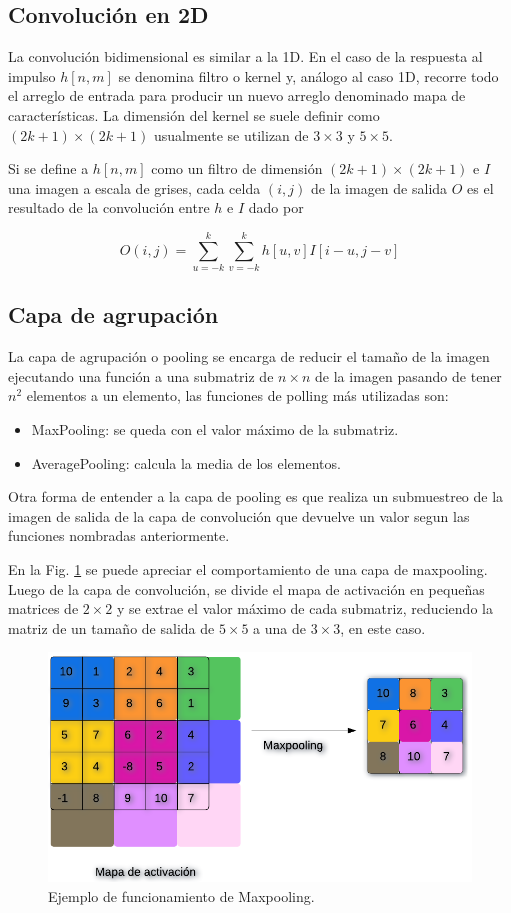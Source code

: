 \subsection{Convolución en 2D}

La convolución bidimensional es similar a la 1D. En el caso de la respuesta al impulso $h[n,m]$ se denomina filtro o kernel y, análogo al caso 1D, recorre todo el arreglo de entrada para producir un nuevo arreglo denominado mapa de características.
La dimensión del kernel se suele definir como $(2k + 1) \times (2k + 1)$ usualmente se utilizan de $3\times3$ y $5\times5$.


Si se define a $h[n,m]$ como un filtro de dimensión $(2k + 1) \times (2k + 1)$ e $I$ una imagen a escala de grises, cada celda $(i,j)$ de la imagen de salida $O$ es el
resultado de la convolución entre $h$ e $I$ dado por

\begin{equation}
    O(i,j)= \sum_{u=-k}^{k} \sum_{v=-k}^{k} h[u,v]I[i-u,j-v]
\end{equation}


\subsection{Capa de agrupación}

La capa de agrupación o pooling se encarga de reducir el tamaño de la imagen ejecutando una función a una submatriz de $n \times n$ de la imagen pasando de tener $n^2$ elementos a un elemento, las funciones de polling más utilizadas son:

\begin{itemize}
    \item MaxPooling: se queda con el valor máximo de la submatriz.
    \item AveragePooling: calcula la media de los elementos.
\end{itemize}

Otra forma de entender a la capa de pooling es que realiza un submuestreo de la imagen de salida de la capa de convolución que devuelve un valor segun las funciones nombradas anteriormente.

En la Fig. \ref{fig:ejemplo-mp} se puede apreciar el comportamiento de una capa de maxpooling. Luego de la capa de convolución, se divide el mapa de activación
en pequeñas matrices de $2 \times 2$ y se extrae el valor máximo de cada submatriz, reduciendo la matriz de un tamaño de salida de $5 \times 5$ a una de $3 \times 3$, en este caso.
\begin{figure}[bth]
    \centering
    \includegraphics[width=.6\textwidth]{imgs/ej-maxpooling.png}
    \caption{Ejemplo de funcionamiento de Maxpooling.}
    \label{fig:ejemplo-mp}
\end{figure}

